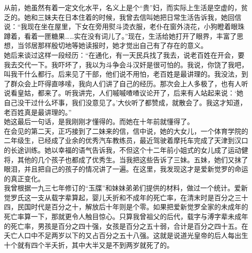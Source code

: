 从前，她虽然有着一定文化水平，名义上是个“贵”妇，而实际上生活是空虚的，贫乏的。她和三妹夫在日本住着的时候，我曾去信叫她把日常生活告诉我，她回信说：“我现在坐在屋里，下女在旁用熨斗烫衣服，老仆在窗外浇花，小狗瞪着眼珠蹲着，看着一匣糖果……实在没有词儿了。”现在，生活给她打开了眼界，丰富了思想，当邻居那样殷切地等她读报时，她才觉出自己有了存在的意义。\\

她后来谈过这样一段经历：“在通化，有一天民兵找了我去，说老百姓在开会，要我去交代一下。我吓坏了，我以为斗争会斗汉奸是很可怕的。我说，你饶了我吧，叫我干什么都行。后来见了干部，他们说不用怕，老百姓是最讲理的。我没法，到了群众会上吓得直哆嗦，我向人们讲了自己的经历。那次会上人多极了，也有人听说看皇姑，都来了。听我讲完，人们嘁嘁喳喳议论开了，后来有人站起来说：‘她自己没干过什么坏事，我们没意见了。’大伙听了都赞成，就散会了。我这才知道，老百姓真是最讲理的。”\\

她这最后一句话，是我刚刚才懂得的。而她在十年前就懂得了。\\

在会见的第二天，正巧接到了二妹来的信，信中说，她的大女儿，一个体育学院的二年级生，已经成了业余的优秀汽车教练员，最近驾驶着摩托车完成了天津到汉口的长途训练。她以幸福的语气告诉我，不但这个十二年前小姐式的女儿成了运动健将，其他的几个孩子也都成了优秀生。当我把这些告诉了三妹。五妹，她们又抹了眼泪，并且把自己的孩子的情况讲了一遍。在这里，我发现这才是爱新觉罗的命运的真正变化。\\

我曾根据一九三七年修订的“玉牒”和妹妹弟弟们提供的材料，做过一个统计。爱新觉罗氏这一支从载字辈算起，婴儿夭折和不成年的死亡率，在清末时是百分之三十四，民国时代是百分之十，解放后十年则是个零。如果把爱新觉罗全家的未成年的死亡率算一下，那就更令人触目惊心。只算我曾祖父的后代，载字与溥字辈未成年的死亡率，男孩是百分之四十强，女孩是百分之五十弱，合计是百分之四十五。在夭亡人口中不足两岁以下的又占百分之五十八强。这就是说道光皇帝的后人每出生十个就有四个半夭折，其中大半又是不到两岁就死了的。\\

